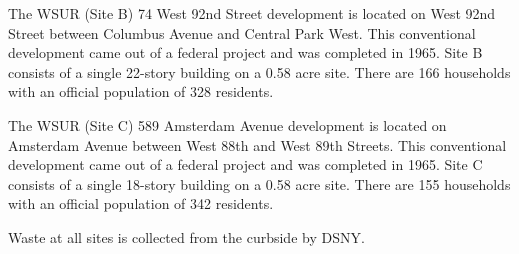 The WSUR (Site B) 74 West 92nd Street development is located on West 92nd Street between Columbus Avenue and Central Park West. This conventional development came out of a federal project and was completed in 1965. Site B consists of a single 22-story building on a 0.58 acre site. There are 166 households with an official population of 328 residents. 

The WSUR (Site C) 589 Amsterdam Avenue development is located on Amsterdam Avenue between West 88th and West 89th Streets. This conventional development came out of a federal project and was completed in 1965. Site C consists of a single 18-story building on a 0.58 acre site. There are 155 households with an official population of 342 residents.

Waste at all sites is collected from the curbside by DSNY.